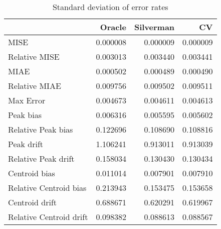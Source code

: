 \begin{table}[H]
\centering
\begin{tabular}{lrrr}
  \hline
 & Oracle & Silverman & CV \\ 
  \hline
MISE & 0.000008 & 0.000009 & 0.000009 \\ 
  Relative MISE & 0.003013 & 0.003440 & 0.003441 \\ 
  MIAE & 0.000502 & 0.000489 & 0.000490 \\ 
  Relative MIAE & 0.009756 & 0.009502 & 0.009511 \\ 
  Max Error & 0.004673 & 0.004611 & 0.004613 \\ 
  Peak bias & 0.006316 & 0.005595 & 0.005602 \\ 
  Relative Peak bias & 0.122696 & 0.108690 & 0.108816 \\ 
  Peak drift & 1.106241 & 0.913011 & 0.913039 \\ 
  Relative Peak drift & 0.158034 & 0.130430 & 0.130434 \\ 
  Centroid bias & 0.011014 & 0.007901 & 0.007910 \\ 
  Relative Centroid bias & 0.213943 & 0.153475 & 0.153658 \\ 
  Centroid drift & 0.688671 & 0.620291 & 0.619967 \\ 
  Relative Centroid drift & 0.098382 & 0.088613 & 0.088567 \\ 
   \hline
\end{tabular}
\caption{Standard deviation of error rates} 
\label{tbl:stddev_error_rates}
\end{table}
